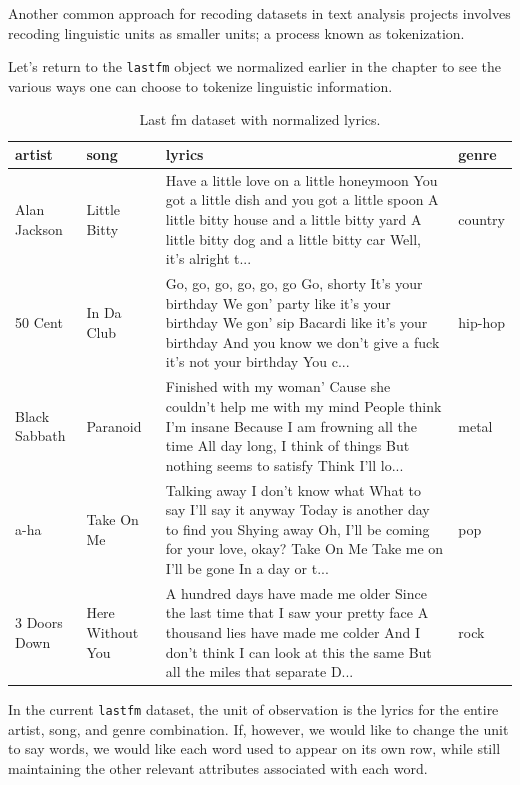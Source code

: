 \documentclass[
]{article}
\begin{document}
Another common approach for recoding datasets in text analysis projects involves recoding linguistic units as smaller units; a process known as tokenization.

Let's return to the \texttt{lastfm} object we normalized earlier in the chapter to see the various ways one can choose to tokenize linguistic information.

\begin{table}

\caption{\label{tab:td-lastfm-clean-end-lines-preview-2}Last fm dataset with normalized lyrics.}
\centering
\begin{tabular}[t]{llll}
\toprule
artist & song & lyrics & genre\\
\midrule
Alan Jackson & Little Bitty & Have a little love on a little honeymoon You got a little dish and you got a little spoon A little bitty house and a little bitty yard A little bitty dog and a little bitty car Well, it's alright t... & country\\
50 Cent & In Da Club & Go, go, go, go, go, go Go, shorty It's your birthday We gon' party like it's your birthday We gon' sip Bacardi like it's your birthday And you know we don't give a fuck it's not your birthday You c... & hip-hop\\
Black Sabbath & Paranoid & Finished with my woman' Cause she couldn't help me with my mind People think I'm insane Because I am frowning all the time All day long, I think of things But nothing seems to satisfy Think I'll lo... & metal\\
a-ha & Take On Me & Talking away I don't know what What to say I'll say it anyway Today is another day to find you Shying away Oh, I'll be coming for your love, okay? Take On Me  Take me on  I'll be gone In a day or t... & pop\\
3 Doors Down & Here Without You & A hundred days have made me older Since the last time that I saw your pretty face A thousand lies have made me colder And I don't think I can look at this the same But all the miles that separate D... & rock\\
\bottomrule
\end{tabular}
\end{table}

In the current \texttt{lastfm} dataset, the unit of observation is the lyrics for the entire artist, song, and genre combination. If, however, we would like to change the unit to say words, we would like each word used to appear on its own row, while still maintaining the other relevant attributes associated with each word.
\end{document}
